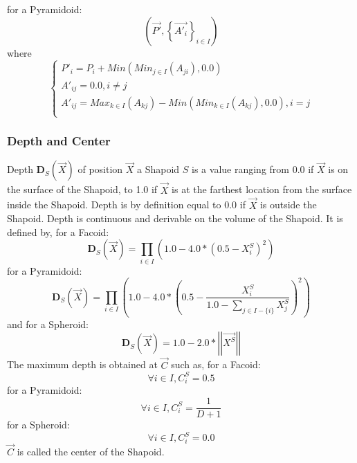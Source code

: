 \documentclass[12pt, a4paper]{article}
\begin{document}
for a Pyramidoid:\\
\begin{equation}
\left(\overrightarrow{P'},\left\lbrace\overrightarrow{A'_i}\right\rbrace_{i\in I}\right)
\end{equation}
where\\
\begin{equation}
\left\lbrace
\begin{array}{l}
P'_i=P_i+Min\left(Min_{j\in I}(A_{ji}),0.0\right)\\
A'_{ij}=0.0,i\neq j\\
A'_{ij}=Max_{k\in I}(A_{kj})-Min\left(Min_{k\in I}(A_{kj}),0.0\right),i=j\\
\end{array}
\right.
\end{equation}


\subsubsection{Depth and Center}

Depth $\mathbf{D}_S(\overrightarrow{X})$ of position $\overrightarrow{X}$ a Shapoid $S$ is a value ranging from 0.0 if $\overrightarrow{X}$ is on the surface of the Shapoid, to 1.0 if $\overrightarrow{X}$ is at the farthest location from the surface inside the Shapoid. Depth is by definition equal to 0.0 if $\overrightarrow{X}$ is outside the Shapoid. Depth is continuous and derivable on the volume of the Shapoid. It is defined by, for a Facoid:\\
\begin{equation}
\mathbf{D}_S(\overrightarrow{X})=\prod_{i\in I}\left(1.0-4.0*(0.5-X^S_i)^2\right)
\end{equation}
for a Pyramidoid:\\
\begin{equation}
\mathbf{D}_S(\overrightarrow{X})=\prod_{i\in I}\left(1.0-4.0*\left(0.5-\frac{X^S_i}{1.0-\sum_{j\in I-\lbrace i\rbrace}X^S_j}\right)^2\right)
\end{equation}
and for a Spheroid:\\
\begin{equation}
\mathbf{D}_S(\overrightarrow{X})=1.0-2.0*\left|\left|\overrightarrow{X^S}\right|\right|
\end{equation}
The maximum depth is obtained at $\overrightarrow{C}$ such as, for a Facoid:\\
\begin{equation}
\forall i\in I,C_i^S=0.5
\end{equation}
for a Pyramidoid:\\
\begin{equation}
\forall i\in I,C_i^S=\frac{1}{D+1}
\end{equation}
for a Spheroid:\\
\begin{equation}
\forall i\in I,C_i^S=0.0
\end{equation}
$\overrightarrow{C}$ is called the center of the Shapoid.
\end{document}
